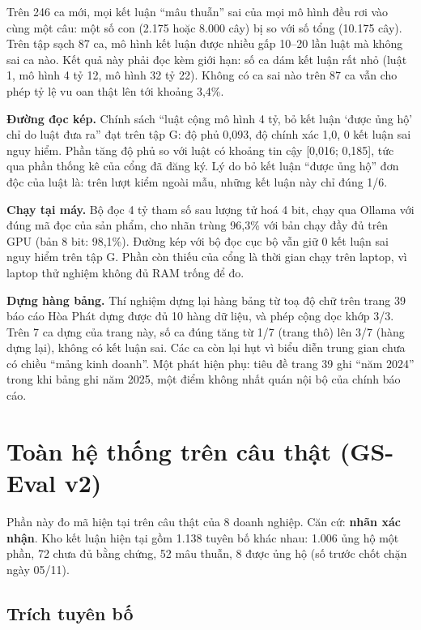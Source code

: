 Trên 246 ca mới, mọi kết luận “mâu thuẫn” sai của mọi mô hình đều rơi vào cùng một câu: một số con (2.175 hoặc 8.000 cây) bị so với số tổng (10.175 cây). Trên tập sạch 87 ca, mô hình kết luận được nhiều gấp 10–20 lần luật mà không sai ca nào. Kết quả này phải đọc kèm giới hạn: số ca dám kết luận rất nhỏ (luật 1, mô hình 4 tỷ 12, mô hình 32 tỷ 22). Không có ca sai nào trên 87 ca vẫn cho phép tỷ lệ vu oan thật lên tới khoảng 3,4\%.

\textbf{Đường đọc kép.} Chính sách “luật cộng mô hình 4 tỷ, bỏ kết luận ‘được ủng hộ’ chỉ do luật đưa ra” đạt trên tập G: độ phủ 0,093, độ chính xác 1,0, 0 kết luận sai nguy hiểm. Phần tăng độ phủ so với luật có khoảng tin cậy [0,016; 0,185], tức qua phần thống kê của cổng đã đăng ký. Lý do bỏ kết luận “được ủng hộ” đơn độc của luật là: trên lượt kiểm ngoài mẫu, những kết luận này chỉ đúng 1/6.

\textbf{Chạy tại máy.} Bộ đọc 4 tỷ tham số sau lượng tử hoá 4 bit, chạy qua Ollama với đúng mã đọc của sản phẩm, cho nhãn trùng 96,3\% với bản chạy đầy đủ trên GPU (bản 8 bit: 98,1\%). Đường kép với bộ đọc cục bộ vẫn giữ 0 kết luận sai nguy hiểm trên tập G. Phần còn thiếu của cổng là thời gian chạy trên laptop, vì laptop thử nghiệm không đủ RAM trống để đo.

\textbf{Dựng hàng bảng.} Thí nghiệm dựng lại hàng bảng từ toạ độ chữ trên trang 39 báo cáo Hòa Phát dựng được đủ 10 hàng dữ liệu, và phép cộng dọc khớp 3/3. Trên 7 ca dựng của trang này, số ca đúng tăng từ 1/7 (trang thô) lên 3/7 (hàng dựng lại), không có kết luận sai. Các ca còn lại hụt vì biểu diễn trung gian chưa có chiều “mảng kinh doanh”. Một phát hiện phụ: tiêu đề trang 39 ghi “năm 2024” trong khi bảng ghi năm 2025, một điểm không nhất quán nội bộ của chính báo cáo.

\section{Toàn hệ thống trên câu thật (GS-Eval v2)}\label{sec:gseval-kq}

Phần này đo mã hiện tại trên câu thật của 8 doanh nghiệp. Căn cứ: \textbf{nhãn xác nhận}. Kho kết luận hiện tại gồm 1.138 tuyên bố khác nhau: 1.006 ủng hộ một phần, 72 chưa đủ bằng chứng, 52 mâu thuẫn, 8 được ủng hộ (số trước chốt chặn ngày 05/11).

\subsection{Trích tuyên bố}

